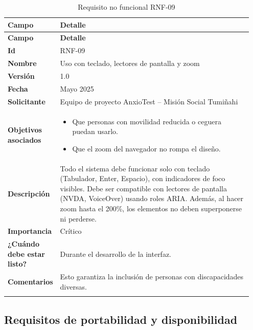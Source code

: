 \begin{longtable}{p{0.15\linewidth} p{0.80\linewidth}}
\toprule
\rowcolor{tableheader!20}
\textbf{Campo} & \textbf{Detalle} \\
\midrule
\endfirsthead
\rowcolor{tableheader!20}
\textbf{Campo} & \textbf{Detalle} \\
\midrule
\endhead
\bottomrule
\endfoot
\textbf{Id} & RNF-09 \\
\textbf{Nombre} & Uso con teclado, lectores de pantalla y zoom \\
\textbf{Versión} & 1.0 \\
\textbf{Fecha} & Mayo 2025 \\
\textbf{Solicitante} & Equipo de proyecto AnxioTest – Misión Social Tumiñahi \\
\textbf{Objetivos asociados} & 
  \begin{itemize}
    \item Que personas con movilidad reducida o ceguera puedan usarlo.
    \item Que el zoom del navegador no rompa el diseño.
  \end{itemize} \\
\textbf{Descripción} & Todo el sistema debe funcionar solo con teclado (Tabulador, Enter, Espacio), con indicadores de foco visibles. Debe ser compatible con lectores de pantalla (NVDA, VoiceOver) usando roles ARIA. Además, al hacer zoom hasta el 200\%, los elementos no deben superponerse ni perderse. \\
\textbf{Importancia} & Crítico \\
\textbf{¿Cuándo debe estar listo?} & Durante el desarrollo de la interfaz. \\
\textbf{Comentarios} & Esto garantiza la inclusión de personas con discapacidades diversas. \\
\bottomrule
\caption{Requisito no funcional RNF-09}
\end{longtable}

\subsection{Requisitos de portabilidad y disponibilidad}
\label{sec:rnf_portabilidad_disponibilidad}

